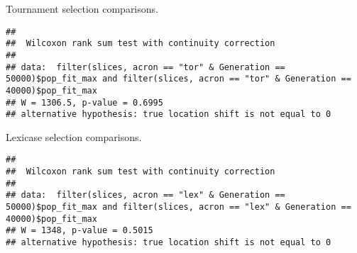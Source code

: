 \documentclass[]{book}
\newenvironment{Shaded}{\begin{snugshade}}{\end{snugshade}}
\newcommand{\DataTypeTok}[1]{\textcolor[rgb]{0.13,0.29,0.53}{#1}}
\newcommand{\DecValTok}[1]{\textcolor[rgb]{0.00,0.00,0.81}{#1}}
\newcommand{\KeywordTok}[1]{\textcolor[rgb]{0.13,0.29,0.53}{\textbf{#1}}}
\newcommand{\NormalTok}[1]{#1}
\newcommand{\OperatorTok}[1]{\textcolor[rgb]{0.81,0.36,0.00}{\textbf{#1}}}
\newcommand{\StringTok}[1]{\textcolor[rgb]{0.31,0.60,0.02}{#1}}
\begin{document}
Tournament selection comparisons.

\begin{Shaded}
\end{Shaded}

\begin{verbatim}
## 
##  Wilcoxon rank sum test with continuity correction
## 
## data:  filter(slices, acron == "tor" & Generation == 50000)$pop_fit_max and filter(slices, acron == "tor" & Generation == 40000)$pop_fit_max
## W = 1306.5, p-value = 0.6995
## alternative hypothesis: true location shift is not equal to 0
\end{verbatim}

Lexicase selection comparisons.

\begin{Shaded}
\end{Shaded}

\begin{verbatim}
## 
##  Wilcoxon rank sum test with continuity correction
## 
## data:  filter(slices, acron == "lex" & Generation == 50000)$pop_fit_max and filter(slices, acron == "lex" & Generation == 40000)$pop_fit_max
## W = 1348, p-value = 0.5015
## alternative hypothesis: true location shift is not equal to 0
\end{verbatim}
\end{document}

